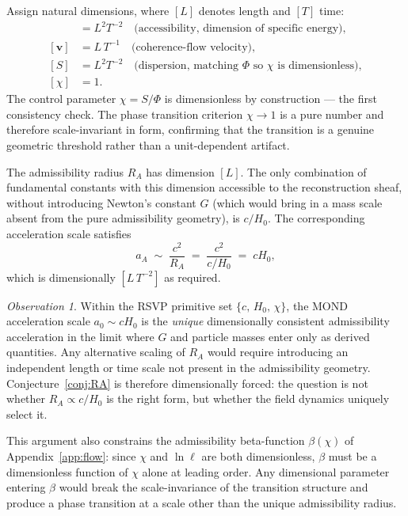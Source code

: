\documentclass[11pt, a4paper]{article}
\theoremstyle{plain}
\theoremstyle{definition}
\theoremstyle{remark}
\newtheorem{observation}[theorem]{Observation}
\newcommand{\RA}{R_{\!A}}
\newcommand{\aA}{a_{\!A}}
\begin{document}
Assign natural dimensions, where $[L]$ denotes length and $[T]$ time:
\begin{align*}
  [\Phi] &= L^2 T^{-2} \quad \text{(accessibility, dimension of specific energy)}, \\
  [\mathbf{v}] &= L\,T^{-1} \quad \text{(coherence-flow velocity)}, \\
  [S] &= L^2 T^{-2} \quad \text{(dispersion, matching $\Phi$ so $\chi$ is dimensionless)}, \\
  [\chi] &= 1.
\end{align*}
The control parameter $\chi = S/\Phi$ is dimensionless by construction --- the first
consistency check. The phase transition criterion $\chi \to 1$ is a pure number and
therefore scale-invariant in form, confirming that the transition is a genuine
geometric threshold rather than a unit-dependent artifact.

The admissibility radius $\RA$ has dimension $[L]$. The only combination of
fundamental constants with this dimension accessible to the reconstruction sheaf,
without introducing Newton's constant $G$ (which would bring in a mass scale absent
from the pure admissibility geometry), is $c/H_0$. The corresponding acceleration
scale satisfies
\[
  \aA \;\sim\; \frac{c^2}{\RA} \;=\; \frac{c^2}{c/H_0} \;=\; cH_0,
\]
which is dimensionally $[L\,T^{-2}]$ as required.

\begin{observation}
\label{obs:dimensional}
Within the RSVP primitive set $\{c,\, H_0,\, \chi\}$, the MOND acceleration scale
$a_0 \sim cH_0$ is the \emph{unique} dimensionally consistent admissibility
acceleration in the limit where $G$ and particle masses enter only as derived
quantities. Any alternative scaling of $\RA$ would require introducing an independent
length or time scale not present in the admissibility geometry.
Conjecture~\ref{conj:RA} is therefore dimensionally forced: the question is not
whether $\RA \propto c/H_0$ is the right form, but whether the field dynamics
uniquely select it.
\end{observation}

This argument also constrains the admissibility beta-function $\beta(\chi)$ of
Appendix~\ref{app:flow}: since $\chi$ and $\ln\ell$ are both dimensionless, $\beta$
must be a dimensionless function of $\chi$ alone at leading order. Any dimensional
parameter entering $\beta$ would break the scale-invariance of the transition
structure and produce a phase transition at a scale other than the unique admissibility
radius.
\end{document}

